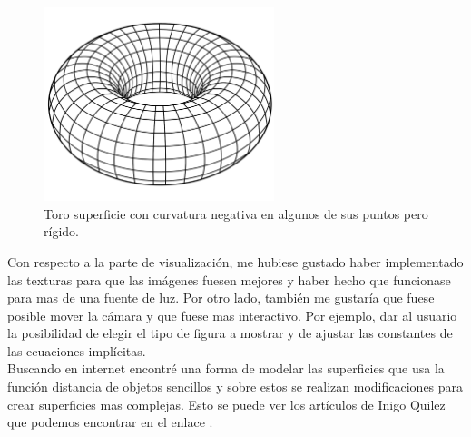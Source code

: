 	\begin{figure}[h]
		\begin{center}
			\includegraphics[width=0.6\textwidth]{imagenes/toro.png}
		\end{center}
		\caption{Toro superficie con curvatura negativa en algunos de sus puntos pero rígido.}
		\label{fig:etiq_21}
	\end{figure}


Con respecto a la parte de visualización, me hubiese gustado haber implementado las texturas para que las imágenes fuesen mejores y haber hecho que funcionase para mas de una fuente de luz. Por otro lado, también me gustaría que fuese posible mover la cámara y que fuese mas interactivo. Por ejemplo, dar al usuario la posibilidad de elegir el tipo de figura a mostrar y de ajustar las constantes de las ecuaciones implícitas.
${ }$\\

Buscando en internet encontré una forma de modelar las superficies que usa la función distancia de objetos sencillos y sobre estos se realizan modificaciones para crear superficies mas complejas. Esto se puede ver los artículos de Inigo Quilez que podemos encontrar en el enlace \cite{IQuilez}.


